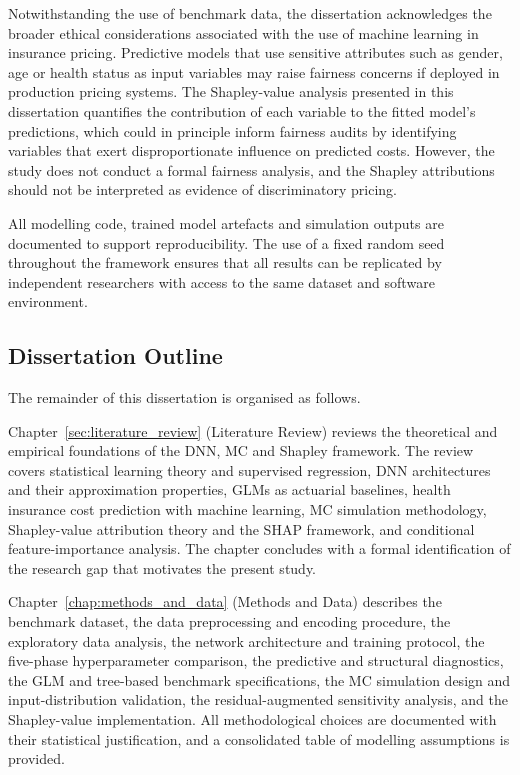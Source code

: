 Notwithstanding the use of benchmark data, the dissertation acknowledges
the broader ethical considerations associated with the use of machine
learning in insurance pricing.  Predictive models that use sensitive
attributes such as gender, age or health status as input variables may
raise fairness concerns if deployed in production pricing systems.  The
Shapley-value analysis presented in this dissertation quantifies the
contribution of each variable to the fitted model's predictions, which
could in principle inform fairness audits by identifying variables that
exert disproportionate influence on predicted costs.  However, the study
does not conduct a formal fairness analysis, and the Shapley
attributions should not be interpreted as evidence of discriminatory
pricing.

All modelling code, trained model artefacts and simulation outputs are
documented to support reproducibility.  The use of a fixed random seed
throughout the framework ensures that all results can be replicated by
independent researchers with access to the same dataset and software
environment.


\subsection{Dissertation Outline}
\label{sec:dissertation_outline}

The remainder of this dissertation is organised as follows.

Chapter~\ref{sec:literature_review} (Literature Review)
reviews the theoretical and empirical foundations of the
DNN, MC and Shapley framework.  The review covers statistical
learning theory and supervised regression, DNN
architectures and their approximation properties, GLMs as actuarial baselines, health insurance cost prediction with
machine learning, MC simulation methodology, Shapley-value
attribution theory and the SHAP framework, and conditional
feature-importance analysis.  The chapter concludes with a formal
identification of the research gap that motivates the present study.

Chapter~\ref{chap:methods_and_data} (Methods and Data)
describes the benchmark dataset, the data preprocessing and
encoding procedure, the exploratory data analysis, the network
architecture and training protocol, the five-phase hyperparameter
comparison, the predictive and structural diagnostics, the GLM and
tree-based benchmark specifications, the MC simulation design
and input-distribution validation, the residual-augmented sensitivity
analysis, and the Shapley-value implementation.  All methodological
choices are documented with their statistical justification, and a
consolidated table of modelling assumptions is provided.


